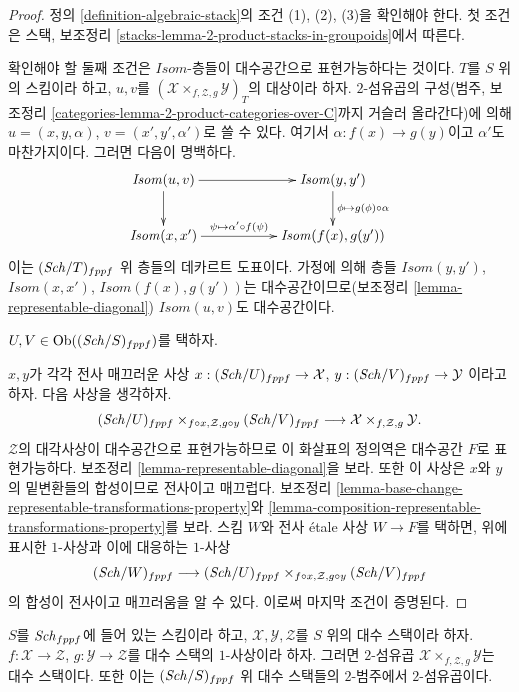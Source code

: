 \begin{proof}
정의 \ref{definition-algebraic-stack}의 조건 (1), (2), (3)을 확인해야
한다. 첫 조건은 스택, 보조정리
\ref{stacks-lemma-2-product-stacks-in-groupoids}에서 따른다.

\medskip\noindent
확인해야 할 둘째 조건은 $\mathit{Isom}$-층들이 대수공간으로
표현가능하다는 것이다. $T$를 $S$ 위의 스킴이라 하고, $u, v$를
$(\mathcal{X} \times_{f, \mathcal{Z}, g} \mathcal{Y})_T$의 대상이라
하자. $2$-섬유곱의 구성(범주, 보조정리
\ref{categories-lemma-2-product-categories-over-C}까지 거슬러 올라간다)에
의해 $u = (x, y, \alpha)$, $v = (x', y', \alpha')$로 쓸 수 있다.
여기서 $\alpha : f(x) \to g(y)$이고 $\alpha'$도 마찬가지이다. 그러면
다음이 명백하다.
$$
\xymatrix{
\mathit{Isom}(u, v) \ar[d] \ar[rr] & &
\mathit{Isom}(y, y') \ar[d]^{\phi \mapsto g(\phi) \circ \alpha} \\
\mathit{Isom}(x, x') \ar[rr]^-{\psi \mapsto \alpha' \circ f(\psi)} & &
\mathit{Isom}(f(x), g(y'))
}
$$
이는 $(\mathit{Sch}/T)_{fppf}$ 위 층들의 데카르트 도표이다. 가정에 의해 층들
$\mathit{Isom}(y, y')$, $\mathit{Isom}(x, x')$,
$\mathit{Isom}(f(x), g(y'))$는 대수공간이므로(보조정리
\ref{lemma-representable-diagonal}) $\mathit{Isom}(u, v)$도
대수공간이다.

\medskip\noindent
$U, V \in \mathop{\mathrm{Ob}}\nolimits((\mathit{Sch}/S)_{fppf})$를 택하자.
\par\noindent
$x, y$가 각각 전사 매끄러운 사상
$x : (\mathit{Sch}/U)_{fppf} \to \mathcal{X}$,
$y : (\mathit{Sch}/V)_{fppf} \to \mathcal{Y}$
이라고 하자. 다음 사상을 생각하자.
$$
(\mathit{Sch}/U)_{fppf}
\times_{f \circ x, \mathcal{Z}, g \circ y}
(\mathit{Sch}/V)_{fppf}
\longrightarrow
\mathcal{X} \times_{f, \mathcal{Z}, g} \mathcal{Y}.
$$
$\mathcal{Z}$의 대각사상이 대수공간으로 표현가능하므로 이 화살표의
정의역은 대수공간 $F$로 표현가능하다. 보조정리
\ref{lemma-representable-diagonal}을 보라. 또한 이 사상은 $x$와 $y$의
밑변환들의 합성이므로 전사이고 매끄럽다. 보조정리
\ref{lemma-base-change-representable-transformations-property}와
\ref{lemma-composition-representable-transformations-property}를 보라.
스킴 $W$와 전사 \'etale 사상 $W \to F$를 택하면, 위에 표시한
$1$-사상과 이에 대응하는 $1$-사상
$$
(\mathit{Sch}/W)_{fppf}
\longrightarrow
(\mathit{Sch}/U)_{fppf}
\times_{f \circ x, \mathcal{Z}, g \circ y}
(\mathit{Sch}/V)_{fppf}
$$
의 합성이 전사이고 매끄러움을 알 수 있다. 이로써 마지막 조건이
증명된다.
\end{proof}

\begin{lemma}
\label{lemma-2-fibre-product}
$S$를 $\mathit{Sch}_{fppf}$에 들어 있는 스킴이라 하고,
$\mathcal{X}, \mathcal{Y}, \mathcal{Z}$를 $S$ 위의 대수 스택이라 하자.
$f : \mathcal{X} \to \mathcal{Z}$, $g : \mathcal{Y} \to \mathcal{Z}$를
대수 스택의 $1$-사상이라 하자. 그러면 $2$-섬유곱
$\mathcal{X} \times_{f, \mathcal{Z}, g} \mathcal{Y}$는 대수 스택이다.
또한 이는 $(\mathit{Sch}/S)_{fppf}$ 위 대수 스택들의 $2$-범주에서
$2$-섬유곱이다.
\end{lemma}

